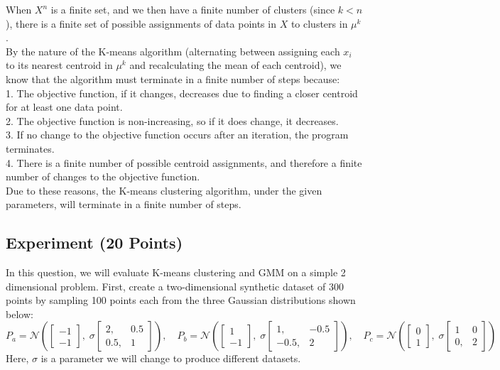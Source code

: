 \documentclass[a4paper]{article}
\newcounter{thm}
\newcommand{\Ncal}{\mathcal{N}}
\theoremstyle{definition}
\newenvironment{soln}{
	\leavevmode\color{blue}\ignorespaces
}{}
\begin{document}
\begin{enumerate}
\begin{soln}
	When $X^n$ is a finite set, and we then have a finite number of clusters (since $k < n$), there is a finite set of possible assignments of data points in $X$ to clusters in $\mu^k$. \\
	By the nature of the K-means algorithm (alternating between assigning each $x_i$ to its nearest centroid in $\mu^k$ and recalculating the mean of each centroid), we know that the algorithm must terminate in a finite number of steps because: \\
	1. The objective function, if it changes, decreases due to finding a closer centroid for at least one data point. \\
	2. The objective function is non-increasing, so if it does change, it decreases. \\
	3. If no change to the objective function occurs after an iteration, the program terminates. \\
	4. There is a finite number of possible centroid assignments, and therefore a finite number of changes to the objective function. \\
	
	Due to these reasons, the K-means clustering algorithm, under the given parameters, will terminate in a finite number of steps.
\end{soln}

\end{enumerate}


\subsection{Experiment (20 Points)}

In this question, we will evaluate
K-means clustering and GMM on a simple 2 dimensional problem.
First, create a two-dimensional synthetic dataset of 300 points by sampling 100 points each from the
three Gaussian distributions shown below:
\[
P_a = \Ncal\left(
\begin{bmatrix}
-1 \\ -1
\end{bmatrix},
\;
\sigma\begin{bmatrix}
2, &0.5 \\ 0.5, &1
\end{bmatrix}
\right),
\quad
P_b = \Ncal\left(
\begin{bmatrix}
1 \\ -1
\end{bmatrix},
\;
 \sigma\begin{bmatrix}
1, &-0.5 \\ -0.5, &2
\end{bmatrix}
\right),
\quad
P_c = \Ncal\left(
\begin{bmatrix}
0 \\ 1
\end{bmatrix},
\;
 \sigma\begin{bmatrix}
1 &0 \\ 0, &2
\end{bmatrix}
\right)
\]
Here, $\sigma$ is a parameter we will change to produce different datasets.\\
\end{document}
